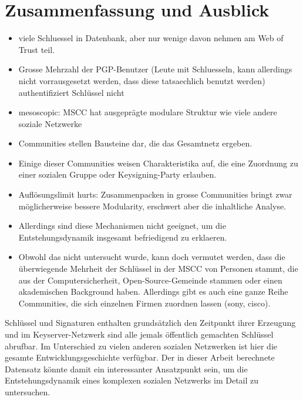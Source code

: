 
\chapter{Zusammenfassung und Ausblick}
\label{ch:Zusammenfassung}

\begin{itemize}

\item viele Schluessel in Datenbank, aber nur wenige davon nehmen am
  Web of Trust teil.
\item Grosse Mehrzahl der PGP-Benutzer (Leute mit Schluesseln,
  kann allerdings nicht vorrausgesetzt werden, dass diese tatsaechlich
  benutzt werden) authentifiziert Schl\"ussel nicht
\item mesoscopic: MSCC hat ausgepr\"agte modulare Struktur wie viele andere
  soziale Netzwerke
\item Communities stellen Bausteine dar, die das Gesamtnetz ergeben.
\item Einige dieser Communities weisen Charakteristika auf, die eine
  Zuordnung zu einer sozialen Gruppe oder Keysigning-Party erlauben.
\item Aufl\"osungslimit hurts: Zusammenpacken in grosse Communities
  bringt zwar m\"oglicherweise bessere Modularity, erschwert aber die
  inhaltliche Analyse.
\item Allerdings sind diese Mechanismen nicht geeignet, um die
  Entstehungsdynamik insgesamt befriedigend zu erklaeren.
\item Obwohl das nicht untersucht wurde, kann doch vermutet werden,
  dass die \"uberwiegende Mehrheit der Schl\"ussel in der MSCC von
  Personen stammt, die aus der Computersicherheit,  Open-Source-Gemeinde stammen oder einen
  akademischen Background haben. Allerdings gibt es auch eine ganze
  Reihe Communities, die sich einzelnen Firmen zuordnen lassen (sony,
  cisco). 

\end{itemize}

Schl\"ussel und Signaturen enthalten grunds\"atzlich den Zeitpunkt
ihrer Erzeugung und im Keyserver-Netzwerk sind alle jemals
\"offentlich gemachten Schl\"ussel abrufbar. Im Unterschied zu vielen
anderen sozialen Netzwerken ist hier die gesamte
Entwicklungsgeschichte verf\"ugbar. Der in dieser Arbeit berechnete
Datensatz k\"onnte damit ein interessanter Ansatzpunkt sein, um die
Entstehungsdynamik eines komplexen sozialen Netzwerks im Detail zu
untersuchen.

